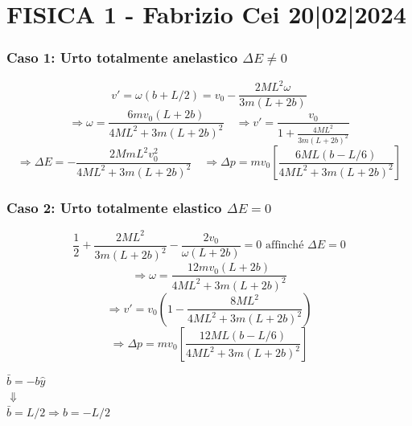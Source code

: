 \section*{FISICA 1 - Fabrizio Cei \hfill 20|02|2024}
\subsubsection*{Caso 1: Urto totalmente anelastico $\Delta E \neq 0$}
\begin{figure}[H]
\raggedleft
{}
\end{figure}

$$ v' = \omega(b + L/2) = v_0 - \frac{2 M L^2 \omega}{3 m(L+2b)} $$
$$ \Rightarrow \omega = \frac{6 m v_0 (L+2b)}{4ML^2 + 3m(L+2b)^2} \quad \Rightarrow v' = \frac{v_0}{1 + \frac{4ML^2}{3m(L+2b)^2}} $$
$$ \Rightarrow \Delta E = - \frac{2 M m L^2 v_0^2}{4ML^2 + 3m(L+2b)^2} \quad \Rightarrow \Delta p = m v_0 \left[ \frac{6ML(b - L/6)}{4ML^2 + 3m(L+2b)^2} \right] $$

\subsubsection*{Caso 2: Urto totalmente elastico $\Delta E = 0$}
\begin{figure}[H]
\raggedleft
{}
\end{figure}

$$ \frac{1}{2} + \frac{2ML^2}{3m(L+2b)^2} - \frac{2v_0}{\omega(L+2b)} = 0 \text{ affinché } \Delta E = 0 $$
$$ \Rightarrow \omega = \frac{12 m v_0 (L+2b)}{4ML^2 + 3m(L+2b)^2} $$
$$ \Rightarrow v' = v_0 \left( 1 - \frac{8 M L^2}{4ML^2 + 3m(L+2b)^2} \right) $$
$$ \Rightarrow \Delta p = m v_0 \left[ \frac{12 M L(b - L/6)}{4ML^2 + 3m(L+2b)^2} \right] $$

$\bar{b} = -b \hat{y}$ \\
$\Downarrow$ \\
$\bar{b} = L/2 \Rightarrow b = -L/2$

